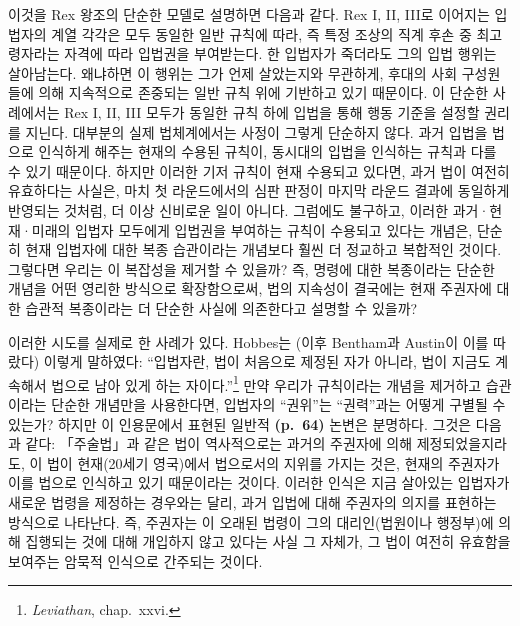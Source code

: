 이것을 Rex 왕조의 단순한 모델로 설명하면 다음과 같다. Rex I, II, III로
이어지는 입법자의 계열 각각은 모두 동일한 일반 규칙에 따라, 즉 특정
조상의 직계 후손 중 최고령자라는 자격에 따라 입법권을 부여받는다. 한
입법자가 죽더라도 그의 입법 행위는 살아남는다. 왜냐하면 이 행위는 그가
언제 살았는지와 무관하게, 후대의 사회 구성원들에 의해 지속적으로
존중되는 일반 규칙 위에 기반하고 있기 때문이다. 이 단순한 사례에서는 Rex
I, II, III 모두가 동일한 규칙 하에 입법을 통해 행동 기준을 설정할 권리를
지닌다. 대부분의 실제 법체계에서는 사정이 그렇게 단순하지 않다. 과거
입법을 법으로 인식하게 해주는 현재의 수용된 규칙이, 동시대의 입법을
인식하는 규칙과 다를 수 있기 때문이다. 하지만 이러한 기저 규칙이 현재
수용되고 있다면, 과거 법이 여전히 유효하다는 사실은, 마치 첫
라운드에서의 심판 판정이 마지막 라운드 결과에 동일하게 반영되는 것처럼,
더 이상 신비로운 일이 아니다. 그럼에도 불구하고, 이러한 과거·현재·미래의
입법자 모두에게 입법권을 부여하는 규칙이 수용되고 있다는 개념은, 단순히
현재 입법자에 대한 복종 습관이라는 개념보다 훨씬 더 정교하고 복합적인
것이다. 그렇다면 우리는 이 복잡성을 제거할 수 있을까? 즉, 명령에 대한
복종이라는 단순한 개념을 어떤 영리한 방식으로 확장함으로써, 법의
지속성이 결국에는 현재 주권자에 대한 습관적 복종이라는 더 단순한 사실에
의존한다고 설명할 수 있을까?

이러한 시도를 실제로 한 사례가 있다. Hobbes는 (이후 Bentham과 Austin이
이를 따랐다) 이렇게 말하였다: ``입법자란, 법이 처음으로 제정된 자가
아니라, 법이 지금도 계속해서 법으로 남아 있게 하는 자이다.''\footnote{\emph{Leviathan},
  chap.~xxvi.} 만약 우리가 규칙이라는 개념을 제거하고 습관이라는 단순한
개념만을 사용한다면, 입법자의 ``권위''는 ``권력''과는 어떻게 구별될 수
있는가? 하지만 이 인용문에서 표현된 일반적 \textbf{(p.~64)} 논변은
분명하다. 그것은 다음과 같다: 「주술법」과 같은 법이 역사적으로는 과거의
주권자에 의해 제정되었을지라도, 이 법이 현재(20세기 영국)에서 법으로서의
지위를 가지는 것은, 현재의 주권자가 이를 법으로 인식하고 있기 때문이라는
것이다. 이러한 인식은 지금 살아있는 입법자가 새로운 법령을
 제정하는 경우와는 달리, 과거 입법에 대해
 주권자의 의지를 표현하는 방식으로 나타난다. 즉,
주권자는 이 오래된 법령이 그의 대리인(법원이나 행정부)에 의해 집행되는
것에 대해 개입하지 않고 있다는 사실 그 자체가, 그 법이 여전히 유효함을
보여주는 암묵적 인식으로 간주되는 것이다.

